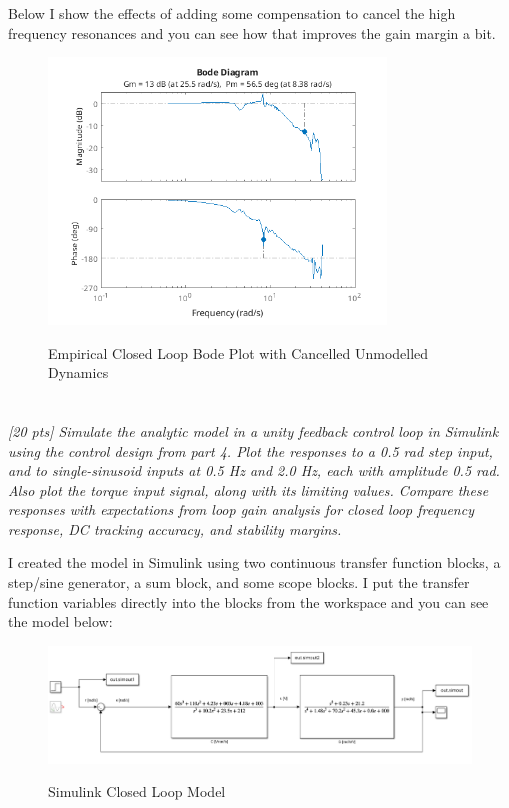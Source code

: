\documentclass{article}
\begin{document}
Below I show the effects of adding some compensation to cancel the high frequency resonances and you can see how that improves the gain margin a bit.

\begin{figure}[H]
    \centering
    \includegraphics[width=0.8\textwidth]{feedbackEmpiricalCancelled.png}
    \label{fig:feedbackEmpiricalCancelled}
    \caption{Empirical Closed Loop Bode Plot with Cancelled Unmodelled Dynamics}
\end{figure}

\section{}

\textit{[20 pts] Simulate the analytic model in a unity feedback control loop in Simulink using the control design from part 4. Plot the responses to a 0.5 rad step input, and to single-sinusoid inputs at 0.5 Hz and 2.0 Hz, each with amplitude 0.5 rad. Also plot the torque input signal, along with its limiting values. Compare these responses with expectations from loop gain analysis for closed loop frequency response, DC tracking accuracy, and stability margins.}

I created the model in Simulink using two continuous transfer function blocks, a step/sine generator, a sum block, and some scope blocks.
I put the transfer function variables directly into the blocks from the workspace and you can see the model below:

\begin{figure}[H]
    \centering
    \includegraphics[width=\textwidth]{simModel.png}
    \label{fig:simModel}
    \caption{Simulink Closed Loop Model}
\end{figure}
\end{document}
